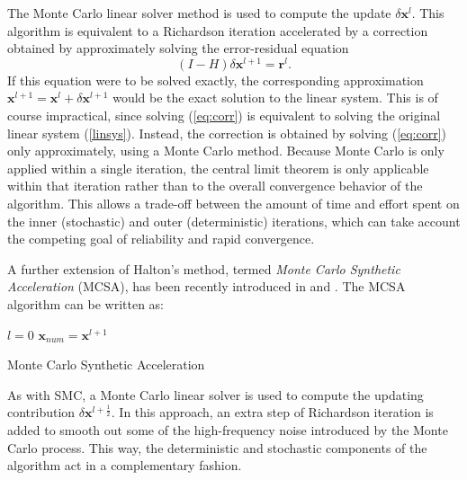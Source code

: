 \documentclass[final,leqno,onefignum,onetabnum]{siamltex1213}
\begin{document}
The Monte Carlo linear solver method is used to compute the update $\delta
\mathbf{x}^{l}$.  This algorithm is equivalent to a Richardson iteration
accelerated by a correction obtained by approximately solving the error-residual
equation
\begin{equation}
(I - H)\delta \mathbf{x}^{l+1} = \mathbf{r}^{l}.
\label{eq:corr}
\end{equation}
If this equation were to be solved exactly, the corresponding approximation
$\mathbf{x}^{l+1}=\mathbf{x}^{l}+\delta \mathbf{x}^{l+1}$ would be the exact
solution to the linear system. This is of course impractical, since solving
(\ref{eq:corr}) is equivalent to solving the original linear system
(\ref{linsys}). Instead, the correction is obtained by
solving (\ref{eq:corr}) only approximately, using a Monte Carlo method.
Because Monte Carlo is only applied within a single iteration, the central
limit theorem is only applicable within that iteration rather than to
the overall convergence behavior of the algorithm. This allows a trade-off
between the amount of time and effort spent on the inner (stochastic) and
outer (deterministic) iterations, which can take account the competing goal
of reliability and rapid convergence.

A further extension of Halton's method, termed
\textit{Monte Carlo Synthetic Acceleration} (MCSA), has been recently
introduced in \cite{ESW2013} and \cite{EMSH2014}.  The MCSA algorithm can be
written as:

\begin{algorithm}[H]
\LinesNumbered
 $l=0$\;
 $\mathbf{x}_{num}=\mathbf{x}^{l+1}$\;
 \caption{Monte Carlo Synthetic Acceleration}
\end{algorithm}

As with SMC, a Monte Carlo linear solver is used to compute the updating
contribution $\delta \mathbf{x}^{l+\frac{1}{2}}$.  In this approach, an
extra step of Richardson iteration is added to smooth out
some of the high-frequency noise introduced by the Monte Carlo process.
This way, the deterministic and stochastic components of the algorithm
act in a complementary fashion.
\end{document}
